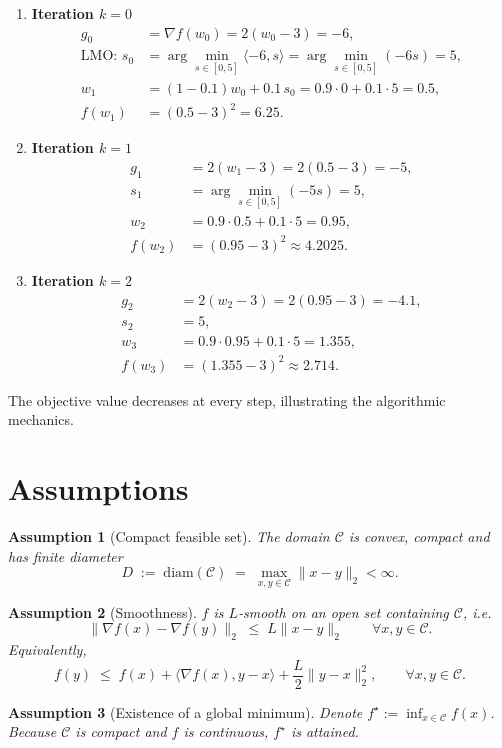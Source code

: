 \documentclass{article}
\newtheorem{assumption}{Assumption}
\newcommand{\diam}{\mathrm{diam}}
\begin{document}
\begin{enumerate}[label=\textbf{Iter \arabic*:},leftmargin=*]
\item \textbf{Iteration $k=0$}
\begin{align*}
g_0 &=\nabla f(w_0)=2(w_0-3)= -6,\\
\text{LMO: } s_0 &=\arg\min_{s\in[0,5]}\langle -6,s\rangle
                =\arg\min_{s\in[0,5]}(-6s)=5,\\
w_{1} &= (1-0.1)w_0+0.1\,s_0 =0.9\cdot0+0.1\cdot5=0.5,\\
f(w_1)&=(0.5-3)^2=6.25.
\end{align*}

\item \textbf{Iteration $k=1$}
\begin{align*}
g_1 &=2(w_1-3)=2(0.5-3)=-5,\\
s_1 &=\arg\min_{s\in[0,5]}(-5s)=5,\\
w_{2} &=0.9\cdot0.5+0.1\cdot5=0.95,\\
f(w_2)&=(0.95-3)^2\approx4.2025.
\end{align*}

\item \textbf{Iteration $k=2$}
\begin{align*}
g_2 &=2(w_2-3)=2(0.95-3)=-4.1,\\
s_2 &=5,\\
w_{3} &=0.9\cdot0.95+0.1\cdot5=1.355,\\
f(w_3)&=(1.355-3)^2\approx2.714.
\end{align*}
\end{enumerate}
The objective value decreases at every step, illustrating the algorithmic mechanics.

\newpage
\section*{Assumptions}
\begin{assumption}[Compact feasible set]\label{as:compact}
The domain $\mathcal{C}$ is convex, compact and has finite diameter
\[
D\;:=\;\diam(\mathcal{C})\;=\;\max_{x,y\in\mathcal{C}}\|x-y\|_2<\infty .
\tag{4}
\]
\end{assumption}
\begin{assumption}[Smoothness]\label{as:smooth}
$f$ is $L$‑smooth on an open set containing $\mathcal{C}$, i.e.
\[
\|\nabla f(x)-\nabla f(y)\|_2\;\le\;L\|x-y\|_2\qquad\forall x,y\in\mathcal{C}.
\tag{5}
\]
Equivalently,
\[
f(y)\;\le\;f(x)+\langle\nabla f(x),y-x\rangle+\frac{L}{2}\|y-x\|_2^2,
\qquad\forall x,y\in\mathcal{C}.
\tag{6}
\]
\end{assumption}
\begin{assumption}[Existence of a global minimum]\label{as:opt}
Denote $f^\star:=\inf_{x\in\mathcal{C}}f(x)$. Because $\mathcal{C}$ is compact and $f$ is continuous, $f^\star$ is attained.
\end{assumption}
\end{document}
